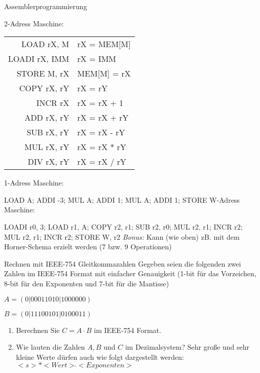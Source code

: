 \documentclass{article}
\begin{document}
\begin{exercise}{Assemblerprogrammierung}
\begin{multicols}{2}
    2-Adress Maschine:\par
    \begin{tabular}{|r|l|}
      \hline
      LOAD rX, M    & rX = MEM[M]  \\
      LOADI rX, IMM & rX = IMM     \\
      STORE M, rX   & MEM[M] = rX  \\
      COPY rX, rY   & rX = rY      \\
      INCR rX       & rX = rX + 1  \\
      ADD rX, rY    & rX = rX + rY \\
      SUB rX, rY    & rX = rX - rY \\
      MUL rX, rY    & rX = rX * rY \\
      DIV rX, rY    & rX = rX / rY \\
      \hline
    \end{tabular}
  \end{multicols}

  \begin{solution}
    1-Adress Maschine:\par LOAD A; ADDI -3; MUL A; ADDI 1; MUL A; ADDI 1; STORE W-Adress Maschine:\par LOADI r0, 3; LOAD r1, A; COPY r2, r1; SUB r2, r0; MUL r2, r1; INCR r2; MUL r2, r1; INCR r2; STORE W, r2\newline
    \textit{Bonus:} Kann (wie oben) zB. mit dem Horner-Schema erzielt werden (7 bzw. 9 Operationen)
  \end{solution}
\end{exercise}

\begin{exercise}[4]{Rechnen mit IEEE-754 Gleitkommazahlen}
  Gegeben seien die folgenden zwei Zahlen im IEEE-754 Format mit einfacher Genauigkeit (1-bit für das Vorzeichen, 8-bit für den Exponenten und 7-bit für die Mantisse)\par
  \centering $A = (0|00011010|1000000)$\par $B = (0|11100101|0100011)$
  \begin{enumerate}
    \item Berechnen Sie $C = A \cdot B$ im IEEE-754 Format.
    \item Wie lauten die Zahlen $A, B$ und $C$ im Dezimalsystem? Sehr große und sehr kleine Werte dürfen auch wie folgt dargestellt werden: $<s>*<Wert> \hat{} <Exponenten>$
  \end{enumerate}
\end{exercise}
\end{document}
